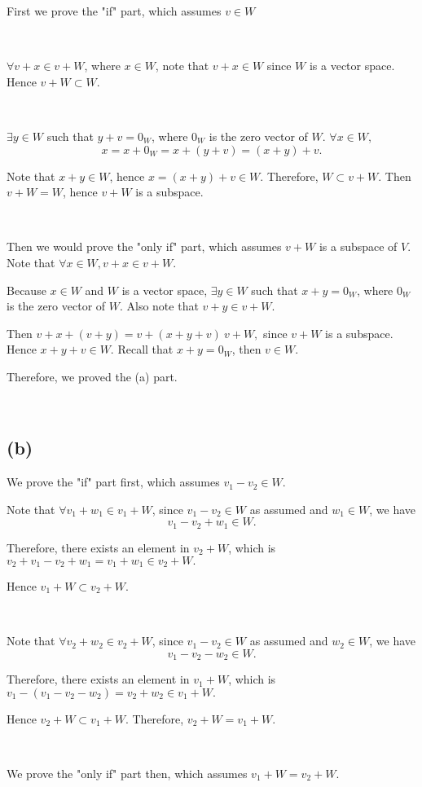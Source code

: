 \documentclass[12pt]{article}%
\begin{document}
First we prove the "if" part, which assumes $v \in W$

~\ 

$\forall v+x \in v+W$, where $x \in W$, note that $v+x \in W$ since $W$ is a vector space. Hence $v+W \subset W.$

~\ 

$\exists y \in W$ such that $y+v=0_W$, where $0_W$ is the zero vector of $W$. 
$\forall x \in W,$ $$x=x+0_W=x+(y+v)=(x+y)+v.$$ 

Note that $x+y\in W$, hence $x=(x+y)+v \in W.$ Therefore, $W \subset v+W.$ Then $v+W=W$, hence $v+W$ is a subspace.

~\ 

Then we would prove the "only if" part, which assumes $v+W$ is a subspace of $V$. Note that $\forall x \in W, v+x \in v+W.$

Because  $x\in W$ and $W$ is a vector space, $\exists y \in W$ such that $x+y=0_W$, where $0_W$ is the zero vector of $W$. Also note that $v+y \in v+W.$

Then $v+x+(v+y)=v+(x+y+v) \ v+W,$ since $v+W$ is a subspace. Hence $x+y+v \in W.$ Recall that $x+y=0_W$, then $v \in W.$

Therefore, we proved the (a) part. 

~\ 

\subsection{(b)} 

We prove the "if" part first, which assumes $v_1-v_2 \in W$.

Note that $\forall v_1+w_1 \in v_1+W$, since $v_1-v_2 \in W$ as assumed and $w_1 \in W$, we have $$v_1-v_2+w_1 \in W.$$

Therefore, there exists an element in $v_2+W$, which is $v_2+v_1-v_2+w_1=v_1+w_1\in v_2+W.$ 

Hence $v_1+W \subset v_2+W.$

~\ 

Note that $\forall v_2+w_2 \in v_2+W$, since $v_1-v_2 \in W$ as assumed and $w_2 \in W$, we have $$v_1-v_2-w_2 \in W.$$

Therefore, there exists an element in $v_1+W$, which is $v_1-(v_1-v_2-w_2)=v_2+w_2\in v_1+W.$ 

Hence $v_2+W \subset v_1+W.$ Therefore, $v_2+W = v_1+W.$

~\ 

We prove the "only if" part then, which assumes $v_1+W = v_2+W$. 
\end{document}
